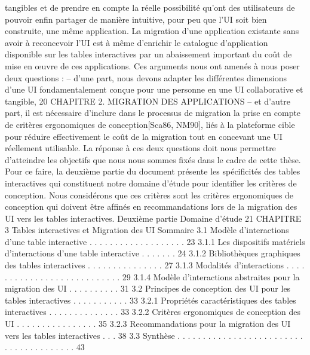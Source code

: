 \documentclass{article}
\begin{document}
tangibles et de prendre en compte la r\'{e}elle possibilit\'{e} qu’ont des utilisateurs de pouvoir enﬁn partager
de mani\`{e}re intuitive, pour peu que l’UI soit bien construite, une m\^{e}me application. La migration d’une
application existante sans avoir \`{a} reconcevoir l’UI est \`{a} m\^{e}me d’enrichir le catalogue d’application
disponible sur les tables interactives par un abaissement important du co\^{u}t de mise en œuvre de ces
applications.
Ces arguments nous ont amen\'{e}s \`{a} nous poser deux questions :
– d’une part, nous devons adapter les diff\'{e}rentes dimensions d’une UI fondamentalement con\c{c}ue
pour une personne en une UI collaborative et tangible,
20
CHAPITRE 2. MIGRATION DES APPLICATIONS
– et d’autre part, il est n\'{e}cessaire d’inclure dans le processus de migration la prise en compte
de crit\`{e}res ergonomiques de conception[Sca86, NM90], li\'{e}s \`{a} la plateforme cible pour r\'{e}duire
effectivement le co\^{u}t de la migration tout en concevant une UI r\'{e}ellement utilisable.
La r\'{e}ponse \`{a} ces deux questions doit nous permettre d’atteindre les objectifs que nous nous sommes
ﬁx\'{e}s dans le cadre de cette th\`{e}se. Pour ce faire, la deuxi\`{e}me partie du document pr\'{e}sente les sp\'{e}ciﬁcit\'{e}s des tables interactives qui constituent notre domaine d’\'{e}tude pour identiﬁer les crit\`{e}res de conception. Nous consid\'{e}rons que ces crit\`{e}res sont les crit\`{e}res ergonomiques de conception qui doivent \^{e}tre
afﬁn\'{e}s en recommandations lors de la migration des UI vers les tables interactives.
Deuxi\`{e}me partie
Domaine d’\'{e}tude
21
CHAPITRE 3
Tables interactives et Migration des UI
Sommaire
3.1
Mod\`{e}le d’interactions d’une table interactive . . . . . . . . . . . . . . . . . . .
23
3.1.1
Les dispositifs mat\'{e}riels d’interactions d’une table interactive
. . . . . . .
24
3.1.2
Biblioth\`{e}ques graphiques des tables interactives . . . . . . . . . . . . . . .
27
3.1.3
Modalit\'{e}s d’interactions . . . . . . . . . . . . . . . . . . . . . . . . . . .
29
3.1.4
Mod\`{e}le d’interactions abstraites pour la migration des UI . . . . . . . . . .
31
3.2
Principes de conception des UI pour les tables interactives
. . . . . . . . . . .
33
3.2.1
Propri\'{e}t\'{e}s caract\'{e}ristiques des tables interactives . . . . . . . . . . . . . .
33
3.2.2
Crit\`{e}res ergonomiques de conception des UI
. . . . . . . . . . . . . . . .
35
3.2.3
Recommandations pour la migration des UI vers les tables interactives . . .
38
3.3
Synth\`{e}se
. . . . . . . . . . . . . . . . . . . . . . . . . . . . . . . . . . . . . . .
43
\end{document}
